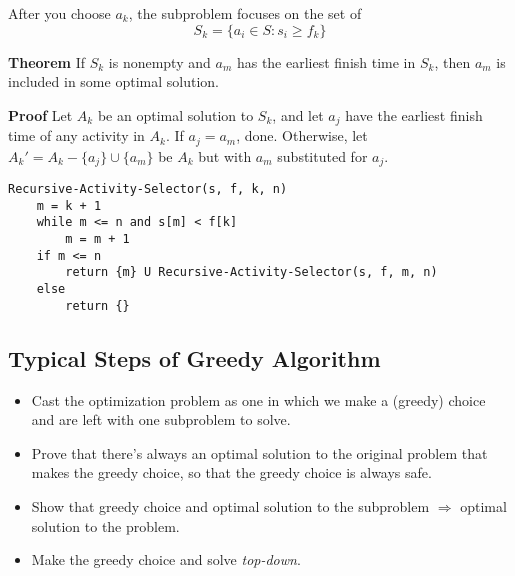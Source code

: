 \documentclass{article}
\begin{document}
After you choose \(a_k\), the subproblem focuses on the set of
\begin{equation*}
    S_k = \{ a_i \in S : s_i \geq f_k\}
\end{equation*}

\textbf{Theorem}
If \(S_k\) is nonempty and \(a_m\) has the earliest finish time in \(S_k\), then
\(a_m\) is included in some optimal solution.

\textbf{Proof} Let \(A_k\) be an optimal solution to \(S_k\), and let \(a_j\)
have the earliest finish time of any activity in \(A_k\). If \(a_j = a_m\),
done. Otherwise, let \(A_k' = A_k - \{ a_j \} \cup \{ a_m \}\) be \(A_k\) but
with \(a_m\) substituted for \(a_j\).

\begin{verbatim}
Recursive-Activity-Selector(s, f, k, n)
    m = k + 1
    while m <= n and s[m] < f[k]
        m = m + 1
    if m <= n
        return {m} U Recursive-Activity-Selector(s, f, m, n)
    else
        return {}
\end{verbatim}

\subsection*{Typical Steps of Greedy Algorithm}
\begin{itemize}
    \item Cast the optimization problem as one in which we make a (greedy)
          choice and are left with one subproblem to solve.
    \item Prove that there's always an optimal solution to the original problem
          that makes the greedy choice, so that the greedy choice is always
          safe.
    \item Show that greedy choice and optimal solution to the subproblem
          \(\Rightarrow\) optimal solution to the problem.
    \item Make the greedy choice and solve \emph{top-down}.
\end{itemize}
\end{document}
